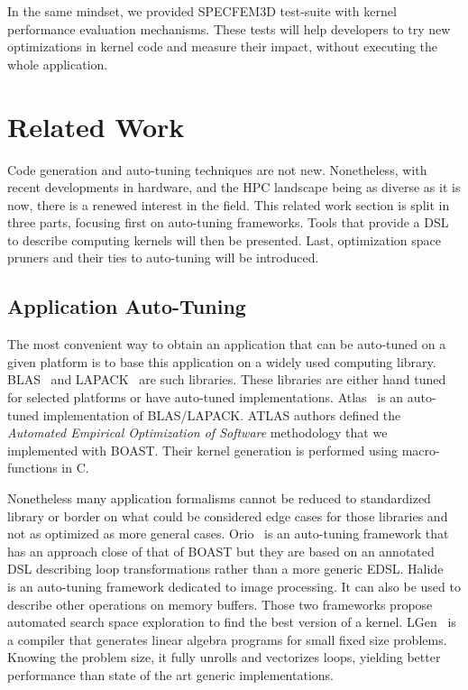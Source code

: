 \documentclass{IEEEtran}
\begin{document}
In the same mindset, we provided SPECFEM3D test-suite with kernel
performance evaluation mechanisms. These tests will help developers to
try new optimizations in kernel code and measure their impact, without
executing the whole application.

\section{Related Work\label{sec:related}}

Code generation and auto-tuning techniques are not new. Nonetheless, with recent
developments in hardware, and the HPC landscape being as diverse as it is now,
there is a renewed interest in the field. This related work section is split in
three parts, focusing first on auto-tuning frameworks. Tools that provide a DSL
to describe computing kernels will then be presented. Last, optimization space
pruners and their ties to auto-tuning will be introduced.

\subsection{Application Auto-Tuning} 

The most convenient way to obtain an application that can be auto-tuned on a
given platform is to base this application on a widely used computing library.
BLAS~\cite{dongarra1990set} and LAPACK~\cite{laug} are such libraries. These
libraries are either hand tuned for selected platforms or have auto-tuned
implementations. Atlas~\cite{whaley04} is an auto-tuned implementation of
BLAS/LAPACK. ATLAS authors defined the \emph{Automated Empirical Optimization of
Software} methodology that we implemented with BOAST. Their kernel generation is
performed using macro-functions in C.

Nonetheless many application formalisms cannot be reduced to standardized
library or border on what could be considered edge cases for those libraries and
not as optimized as more general cases. Orio~\cite{Hart2009:Orio} is an
auto-tuning framework that has an approach close of that of BOAST but they are
based on an annotated DSL describing loop transformations rather than a more
generic EDSL. Halide~\cite{ragan2013halide} is an auto-tuning framework
dedicated to image processing. It can also be used to describe other
operations on memory buffers. Those two frameworks propose automated search
space exploration to find the best version of a kernel.
LGen~\cite{spampinato2014basic} is a compiler that generates linear algebra
programs for small fixed size problems. Knowing the problem size, it fully
unrolls and vectorizes loops, yielding better performance than state of the
art generic implementations.
\end{document}
